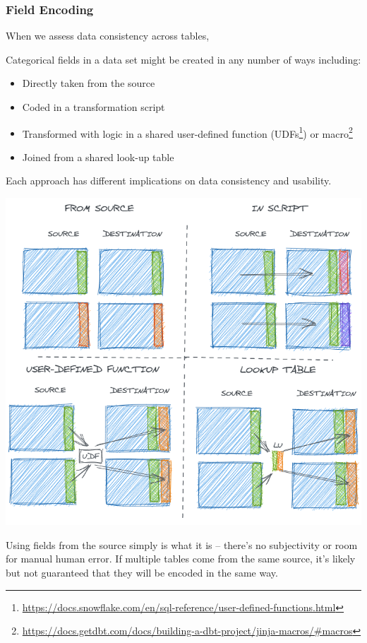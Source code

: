 \documentclass[
]{krantz}
\providecommand{\tightlist}{%
  \setlength{\itemsep}{0pt}\setlength{\parskip}{0pt}}
\renewcommand{\href}[2]{#2\footnote{\url{#1}}}
\begin{document}
\hypertarget{field-encoding-1}{%
\subsubsection{Field Encoding}\label{field-encoding-1}}

When we assess data consistency across tables,

Categorical fields in a data set might be created in any number of ways including:

\begin{itemize}
\tightlist
\item
  Directly taken from the source
\item
  Coded in a transformation script
\item
  Transformed with logic in a shared user-defined function (\href{https://docs.snowflake.com/en/sql-reference/user-defined-functions.html}{UDFs}) or \href{https://docs.getdbt.com/docs/building-a-dbt-project/jinja-macros/\#macros}{macro}
\item
  Joined from a shared look-up table
\end{itemize}

Each approach has different implications on data consistency and usability.

\begin{center}\includegraphics[width=0.9\linewidth]{figures/data-dall/field-encoding} \end{center}

Using fields from the source simply is what it is -- there's no subjectivity or room for manual human error. If multiple tables come from the same source, it's likely but not guaranteed that they will be encoded in the same way.
\end{document}
